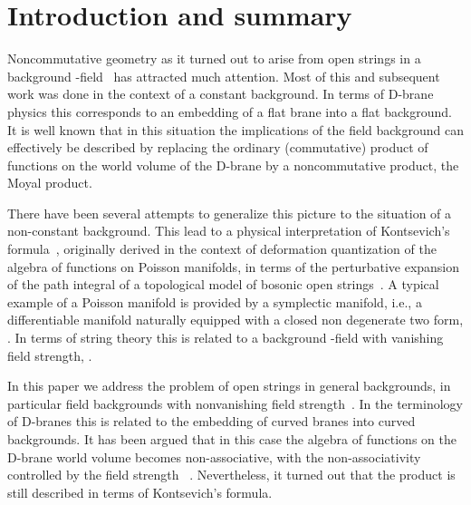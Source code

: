 \documentclass[a4paper,12pt]{article}
\begin{document}
\clearpage
\setcounter{page}{1}



\section{Introduction and summary}
\label{sec:intro}

Noncommutative geometry as it turned out to arise from open strings in a 
background \coordHE{}-field~\cite{Connes:1998cr,Douglas:1998fm,Ardalan:1999ce,
Chu:1999qz,Schomerus:1999ug,Ardalan:2000av,Chu:2000gi,Seiberg:1999vs} has 
attracted much attention. 
Most of this and subsequent work was done in the context 
of a constant background. In terms of D-brane physics this corresponds to 
an embedding of a flat brane into a flat background. 
It is well known that in this situation the implications of the \coordHE{} field 
background can effectively be described by replacing the ordinary 
(commutative) product of functions on the world volume of the D-brane 
by a noncommutative product, the Moyal product. 

There have been several attempts to generalize this picture to the 
situation of a non-constant background. This lead to a physical 
interpretation of Kontsevich's formula~\cite{Kontsevich:1997vb}, originally 
derived in the context of deformation quantization of the algebra of 
functions on Poisson manifolds,
in terms of the 
perturbative expansion of the path integral of a topological model 
of bosonic open strings~\cite{Cattaneo:2000fm}. A typical example of a 
Poisson manifold is provided by a symplectic manifold, i.e., a differentiable 
manifold naturally equipped with a closed non degenerate two form, 
\coordHE{}. 
In terms of string theory this is related to a background \coordHE{}-field with 
vanishing field strength, \coordHE{}. 

In this paper we address the problem of open strings in general backgrounds, 
in particular \coordHE{} field backgrounds with nonvanishing field 
strength~\cite{Ho:2000fv,Cornalba:2001sm,Ho:2001qk}. In the
terminology of D-branes this is related to the embedding of curved branes 
into curved backgrounds. It has been argued that in this case the 
algebra of functions on the D-brane world volume becomes non-associative, 
with the non-associativity controlled by the field strength 
\coordHE{}~\cite{Cornalba:2001sm}. Nevertheless, it turned out that the product is 
still described in terms of Kontsevich's formula. 
\end{document}
